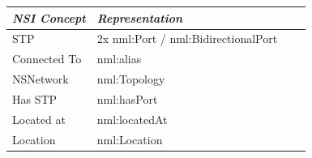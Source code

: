 \documentclass{article}
\begin{document}
\begin{longtable}{|p{1.939in}|p{2.443in}|p{0.059in}|p{0.059in}|}
\hline
\begin{minipage}[t]{1.939in}\centering  \textit{NSI Concept}\end{minipage} & \begin{minipage}[t]{2.443in}\centering  \textit{Representation}\end{minipage}\\
\hline
\begin{minipage}[t]{0.059in}\centering  STP\end{minipage} & \begin{minipage}[t]{0.059in}\centering  2x 
nml:Port / nml:BidirectionalPort\end{minipage}\\
\hline
\begin{minipage}[t]{1.939in}\centering  Connected To\end{minipage} & \begin{minipage}[t]{2.443in}\centering  nml:alias\end{minipage}\\
\hline
\begin{minipage}[t]{0.059in}\centering  NSNetwork\end{minipage} & \begin{minipage}[t]{0.059in}\centering  nml:Topology\end{minipage}\\
\hline
\begin{minipage}[t]{1.939in}\centering  Has STP\end{minipage} & \begin{minipage}[t]{2.443in}\centering  nml:hasPort\end{minipage}\\
\hline
\begin{minipage}[t]{0.059in}\centering  Located at\end{minipage} & \begin{minipage}[t]{0.059in}\centering  nml:locatedAt\end{minipage}\\
\hline
\begin{minipage}[t]{1.939in}\centering  Location\end{minipage} & \begin{minipage}[t]{2.443in}\centering  nml:Location\end{minipage}\\
\hline

\end{longtable}
\end{document}
